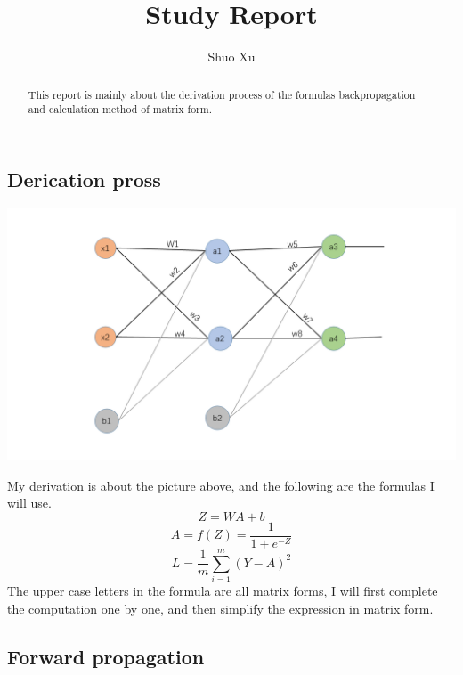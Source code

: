 \documentclass[10pt]{article}
\begin{document}
     \title{Study Report}
     \author{Shuo Xu}
     \maketitle
     \begin{abstract}
         This report is mainly about the derivation process of the formulas backpropagation and calculation method of matrix form.
     \end{abstract}

     \begin{center}

         \section{Derication pross}

         \includegraphics[scale=0.5]{bp2.png}
         \begin{flushleft}
            My derivation is about the picture above, and the following are the formulas I will use.$$Z = WA+b$$
            $$A = f(Z) = \frac{1}{1+e^{-Z}}$$
            $$L = \frac{1}{m}\sum_{i=1}^{m}(Y-A)^{2}$$  %
            The upper case letters in the formula are all matrix forms, I will first complete the computation one by one, and then simplify the expression in matrix form.
         \end{flushleft}
             
     \end{center}
     \subsection*{Forward propagation} 
     \begin{flushleft}
         
     \end{flushleft}

 
\end{document}
